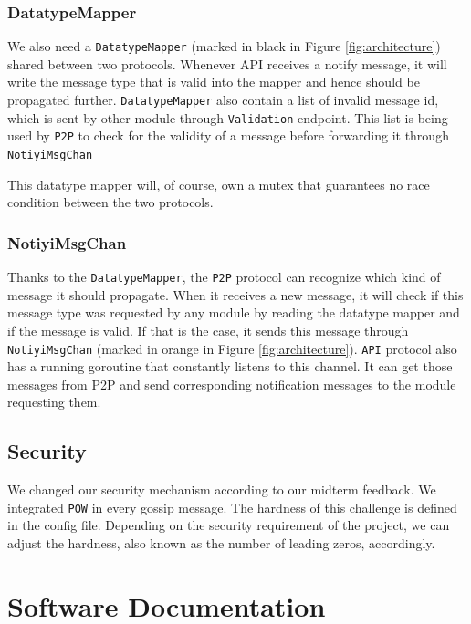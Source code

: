 \subsubsection{DatatypeMapper}

We also need a \texttt{DatatypeMapper} (marked in black in Figure \ref{fig:architecture}) shared between two protocols. Whenever API receives a notify message, it will write the message type that is valid into the mapper and hence should be propagated further. \texttt{DatatypeMapper} also contain a list of invalid message id, which is sent by other module through \texttt{Validation} endpoint. This list is being used by \texttt{P2P} to check for the validity of a message before forwarding it through \texttt{NotiyiMsgChan} 

This datatype mapper will, of course, own a mutex that guarantees no race condition between the two protocols.

\subsubsection{NotiyiMsgChan}

Thanks to the \texttt{DatatypeMapper}, the \texttt{P2P} protocol can recognize which kind of message it should propagate. When it receives a new message, it will check if this message type was requested by any module by reading the datatype mapper and if the message is valid. If that is the case, it sends this message through \texttt{NotiyiMsgChan} (marked in orange in Figure \ref{fig:architecture}). \texttt{API} protocol also has a running goroutine that constantly listens to this channel. It can get those messages from P2P and send corresponding notification messages to the module requesting them. 

\subsection{Security}

We changed our security mechanism according to our midterm feedback. We integrated \texttt{POW} in every gossip message. The hardness of this challenge is defined in the config file. Depending on the security requirement of the project, we can adjust the hardness, also known as the number of leading zeros, accordingly. 

\section{Software Documentation}
